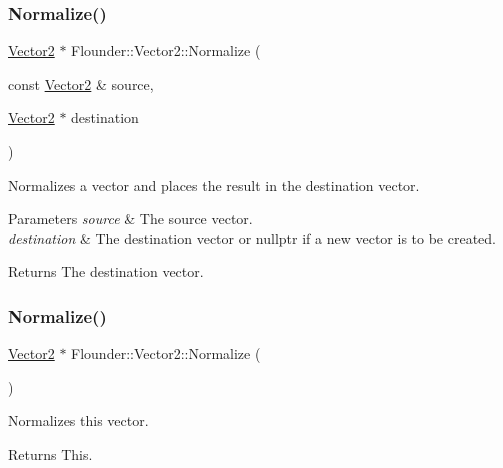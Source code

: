 \subsubsection{\texorpdfstring{Normalize()}{Normalize()}\hspace{0.1cm}{\footnotesize\ttfamily [1/2]}}
{\footnotesize\ttfamily \hyperlink{class_flounder_1_1_vector2}{Vector2} $\ast$ Flounder\+::\+Vector2\+::\+Normalize (\begin{DoxyParamCaption}\item[{const \hyperlink{class_flounder_1_1_vector2}{Vector2} \&}]{source,  }\item[{\hyperlink{class_flounder_1_1_vector2}{Vector2} $\ast$}]{destination }\end{DoxyParamCaption})\hspace{0.3cm}{\ttfamily [static]}}



Normalizes a vector and places the result in the destination vector. 


\begin{DoxyParams}{Parameters}
{\em source} & The source vector. \\
\hline
{\em destination} & The destination vector or nullptr if a new vector is to be created. \\
\hline
\end{DoxyParams}
\begin{DoxyReturn}{Returns}
The destination vector. 
\end{DoxyReturn}
\mbox{\label{class_flounder_1_1_vector2_a2d255dbc61b16175686b321a39d7df80}} 
\subsubsection{\texorpdfstring{Normalize()}{Normalize()}\hspace{0.1cm}{\footnotesize\ttfamily [2/2]}}
{\footnotesize\ttfamily \hyperlink{class_flounder_1_1_vector2}{Vector2} $\ast$ Flounder\+::\+Vector2\+::\+Normalize (\begin{DoxyParamCaption}{ }\end{DoxyParamCaption})}



Normalizes this vector. 

\begin{DoxyReturn}{Returns}
This. 
\end{DoxyReturn}
\mbox{\label{class_flounder_1_1_vector2_ad3080e41d0c61bec0d56ded7f67a98bc}} 
